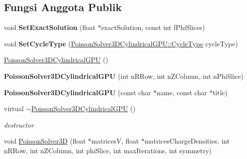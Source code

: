 \subsection*{Fungsi Anggota Publik}
\begin{DoxyCompactItemize}
\item 
\hypertarget{classPoissonSolver3DCylindricalGPU_a4af8506bc7d3b3e06c0337972481f3a2}{}\label{classPoissonSolver3DCylindricalGPU_a4af8506bc7d3b3e06c0337972481f3a2} 
void {\bfseries Set\+Exact\+Solution} (float $\ast$exact\+Solution, const int f\+Phi\+Slices)
\item 
\hypertarget{classPoissonSolver3DCylindricalGPU_a2b4b3e4378a47ba572edded636a73d73}{}\label{classPoissonSolver3DCylindricalGPU_a2b4b3e4378a47ba572edded636a73d73} 
void {\bfseries Set\+Cycle\+Type} (\hyperlink{classPoissonSolver3DCylindricalGPU_adb48f4d0173159081f19f859bb3c0ffc}{Poisson\+Solver3\+D\+Cylindrical\+G\+P\+U\+::\+Cycle\+Type} cycle\+Type)
\item 
\hyperlink{classPoissonSolver3DCylindricalGPU_a3c4108b642189cca05ad6715fde97457}{Poisson\+Solver3\+D\+Cylindrical\+G\+PU} ()
\item 
\hypertarget{classPoissonSolver3DCylindricalGPU_aa3aad0a87c455600dd89c1a1a09664da}{}\label{classPoissonSolver3DCylindricalGPU_aa3aad0a87c455600dd89c1a1a09664da} 
{\bfseries Poisson\+Solver3\+D\+Cylindrical\+G\+PU} (int n\+R\+Row, int n\+Z\+Column, int n\+Phi\+Slice)
\item 
\hypertarget{classPoissonSolver3DCylindricalGPU_aeaad1e86e363d59d364596181224abbb}{}\label{classPoissonSolver3DCylindricalGPU_aeaad1e86e363d59d364596181224abbb} 
{\bfseries Poisson\+Solver3\+D\+Cylindrical\+G\+PU} (const char $\ast$name, const char $\ast$title)
\item 
\hypertarget{classPoissonSolver3DCylindricalGPU_a776eea4dd332fb6923f73e9a5c9124ee}{}\label{classPoissonSolver3DCylindricalGPU_a776eea4dd332fb6923f73e9a5c9124ee} 
virtual \hyperlink{classPoissonSolver3DCylindricalGPU_a776eea4dd332fb6923f73e9a5c9124ee}{$\sim$\+Poisson\+Solver3\+D\+Cylindrical\+G\+PU} ()
\begin{DoxyCompactList}\small\item\em destructor \end{DoxyCompactList}\item 
void \hyperlink{classPoissonSolver3DCylindricalGPU_aa95de949f9cb368eb0c9ee1b8d990a7f}{Poisson\+Solver3D} (float $\ast$matricesV, float $\ast$matrices\+Charge\+Densities, int n\+R\+Row, int n\+Z\+Column, int phi\+Slice, int max\+Iterations, int symmetry)

\end{DoxyCompactItemize}
